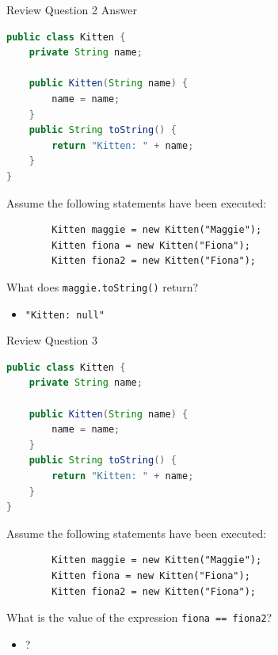 \documentclass{beamer}
\begin{document}
\begin{frame}[fragile]{Review Question 2 Answer}
\vspace{-.05in}
\begin{lstlisting}[language=Java]
public class Kitten {
    private String name;

    public Kitten(String name) {
        name = name;
    }
    public String toString() {
        return "Kitten: " + name;
    }
}
\end{lstlisting}
\vspace{-.05in}
Assume the following statements have been executed:
\vspace{-.05in}
\begin{lstlisting}
        Kitten maggie = new Kitten("Maggie");
        Kitten fiona = new Kitten("Fiona");
        Kitten fiona2 = new Kitten("Fiona");
\end{lstlisting}
\vspace{-.05in}
What does {\tt maggie.toString()} return?
\begin{itemize}
\itemsep0em
\item {\tt "Kitten: null"}
\end{itemize}
\end{frame}

\begin{frame}[fragile]{Review Question 3}
\vspace{-.05in}
\begin{lstlisting}[language=Java]
public class Kitten {
    private String name;

    public Kitten(String name) {
        name = name;
    }
    public String toString() {
        return "Kitten: " + name;
    }
}
\end{lstlisting}
\vspace{-.05in}
Assume the following statements have been executed:
\vspace{-.05in}
\begin{lstlisting}
        Kitten maggie = new Kitten("Maggie");
        Kitten fiona = new Kitten("Fiona");
        Kitten fiona2 = new Kitten("Fiona");
\end{lstlisting}
\vspace{-.05in}
What is the value of the expression {\tt fiona == fiona2}?
\begin{itemize}
\itemsep0em
\item ?
\end{itemize}
\end{frame}
\end{document}

